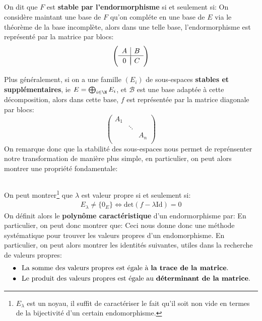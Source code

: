 \subsection*{}
On dit que \(F\) est \textbf{stable par l'endormorphisme} si et seulement si:
On considère maintant une base de \(F\) qu'on compléte en une base de \(E\) via le théorème de la base incomplète, alors dans une telle base, l'endormorphisme est représenté par la matrice par blocs:
\[
   \left(\begin{array}{c|c}
      A & B\\
      \hline\\[-1.7\medskipamount]
      0 & C
   \end{array}\right)
\]
\pagebreak

Plus généralement, si on a une famille \((E_i)\) de sous-espaces \textbf{stables et supplémentaires}, ie \(E = \bigoplus_{i \in \N} E_i\), et \(\mathcal{B}\) est une base adaptée à cette décomposition, alors dans cette base, \(f\) est représentée par la matrice diagonale par blocs:
\[
   \left(\begin{array}{ccc}
      A_1 & {} & {}\\
      {} & \ddots & {}\\
      {} & {} & A_n\\
   \end{array}\right)
\]
On remarque donc que la stabilité des sous-espaces nous permet de reprénsenter notre transformation de manière plus simple, en particulier, on peut alors montrer une propriété fondamentale:

\subsection*{}
On peut montrer\footnote[1]{\(E_\lambda\) est un noyau, il suffit de caractériser le fait qu'il soit non vide en termes de la bijectivité d'un certain endomorphisme.} que \(\lambda\) est valeur propre si et seulement si:
\begin{align*}
   E_\lambda \neq \bigl\{0_E\bigl\} \Longleftrightarrow \text{det}(f - \lambda \text{Id}) = 0
\end{align*}
On définit alors le \textbf{polynôme caractéristique} d'un endormorphisme par:
En particulier, on peut donc montrer que:
Ceci nous donne donc une méthode systématique pour trouver les valeurs propres d'un endomorphisme. En particulier, on peut alors montrer les identités suivantes, utiles dans la recherche de valeurs propres:
\begin{align*}
   &\bullet \;\; \text{La somme des valeurs propres est égale à \textbf{la trace de la matrice}.} \\
   &\bullet \;\; \text{Le produit des valeurs propres est égale au \textbf{déterminant de la matrice}.}
\end{align*}

